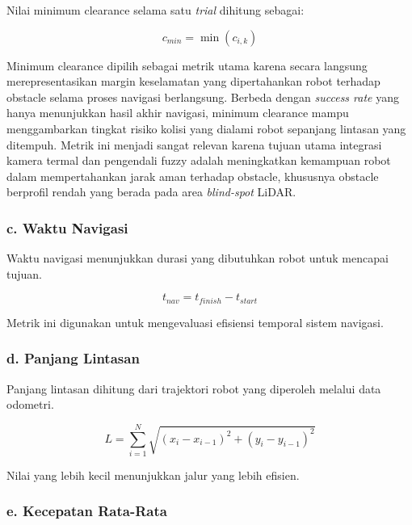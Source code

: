 Nilai minimum clearance selama satu \textit{trial} dihitung sebagai:

\begin{equation}
c_{min}
=
\min(c_{i,k})
\label{eq:min_clearance}
\end{equation}

Minimum clearance dipilih sebagai metrik utama karena secara langsung merepresentasikan margin keselamatan yang dipertahankan robot terhadap obstacle selama proses navigasi berlangsung. Berbeda dengan \textit{success rate} yang hanya menunjukkan hasil akhir navigasi, minimum clearance mampu menggambarkan tingkat risiko kolisi yang dialami robot sepanjang lintasan yang ditempuh. Metrik ini menjadi sangat relevan karena tujuan utama integrasi kamera termal dan pengendali fuzzy adalah meningkatkan kemampuan robot dalam mempertahankan jarak aman terhadap obstacle, khususnya obstacle berprofil rendah yang berada pada area \textit{blind-spot} LiDAR.

\subsubsection*{c. Waktu Navigasi}

Waktu navigasi menunjukkan durasi yang dibutuhkan robot untuk mencapai tujuan.

\begin{equation}
t_{nav}
=
t_{finish}
-
t_{start}
\label{eq:nav_time}
\end{equation}

Metrik ini digunakan untuk mengevaluasi efisiensi temporal sistem navigasi.

\subsubsection*{d. Panjang Lintasan}

Panjang lintasan dihitung dari trajektori robot yang diperoleh melalui data odometri.

\begin{equation}
L
=
\sum_{i=1}^{N}
\sqrt{
(x_i-x_{i-1})^2
+
(y_i-y_{i-1})^2
}
\label{eq:path_length}
\end{equation}

Nilai yang lebih kecil menunjukkan jalur yang lebih efisien.

\subsubsection*{e. Kecepatan Rata-Rata}

